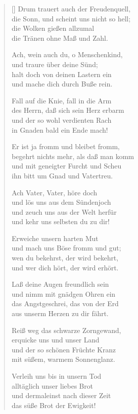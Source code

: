 \begin{multicols}{2}
\begin{verse}[\versewidth]
 Drum trauert auch der Freudenquell,\\
die Sonn, und scheint uns nicht so hell;\\
die Wolken gießen allzumal\\
die Tränen ohne Maß und Zahl.

 Ach, wein auch du, o Menschenkind,\\
und traure über deine Sünd;\\
halt doch von deinen Lastern ein\\
und mache dich durch Buße rein.

 Fall auf die Knie, fall in die Arm\\
des Herrn, daß sich sein Herz erbarm\\
und der so wohl verdienten Rach\\
in Gnaden bald ein Ende mach!

 Er ist ja fromm und bleibet fromm,\\
begehrt nichts mehr, als daß man komm\\
und mit geneigter Furcht und Scheu\\
ihn bitt um Gnad und Vatertreu.

 Ach Vater, Vater, höre doch\\
und lös uns aus dem Sündenjoch\\
und zeuch uns aus der Welt herfür\\
und kehr uns selbsten du zu dir!

 Erweiche unsern harten Mut\\
und mach uns Böse fromm und gut;\\
wen du bekehrst, der wird bekehrt,\\
und wer dich hört, der wird erhört.

 Laß deine Augen freundlich sein\\
und nimm mit gnädgen Ohren ein\\
das Angstgeschrei, das von der Erd\\
aus unserm Herzen zu dir fährt.

 Reiß weg das schwarze Zorngewand,\\
erquicke uns und unser Land\\
und der so schönen Früchte Kranz\\
mit süßem, warmem Sonnenglanz.

 Verleih uns bis in unsern Tod\\
alltäglich unser liebes Brot\\
und dermaleinst nach dieser Zeit\\
das süße Brot der Ewigkeit!

\end{verse}
\end{multicols}

